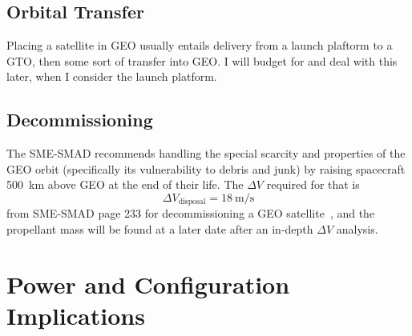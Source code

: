 \documentclass[9pt]{article}
\begin{document}
\subsection{Orbital Transfer}
Placing a satellite in GEO usually entails delivery from a launch plaftorm to a GTO, then some sort of transfer into GEO.
I will budget for and deal with this later, when I consider the launch platform.

\subsection{Decommissioning}

The SME-SMAD recommends handling the special scarcity and properties of the GEO orbit (specifically its vulnerability to debris and junk) by raising spacecraft \qty{500}{\kilo\metre} above GEO at the end of their life.
The $\Delta V$ required for that is
\begin{equation}
  {\Delta V}_\text{disposal} = \qty{18}{\metre\per\second}
\end{equation}
from SME-SMAD page 233 for decommissioning a GEO satellite~\cite{sme}, and the propellant mass will be found at a later date after an in-depth $\Delta V$ analysis.


\section{Power and Configuration Implications}\label{app:powerandconf}
\end{document}
